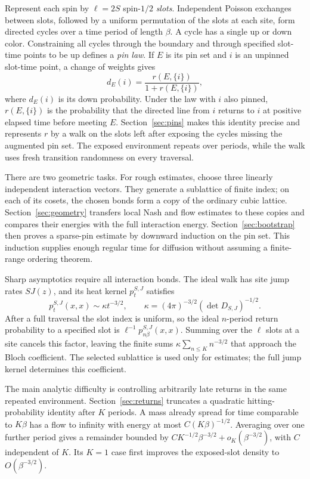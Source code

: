 Represent each spin by $\ell=2S$ spin-$1/2$ \emph{slots}. Independent
Poisson exchanges between slots, followed by a uniform permutation of
the slots at each site, form directed cycles over a time period of
length $\beta$. A cycle has a single up or down color. Constraining
all cycles through the boundary and through specified slot-time points
to be up defines a \emph{pin law}. If $E$ is its pin set and $i$ is
an unpinned slot-time point, a change of weights gives
\[
 d_E(i)=\frac{r(E,\{i\})}{1+r(E,\{i\})},
\]
where $d_E(i)$ is its down probability. Under the law with $i$ also
pinned, $r(E,\{i\})$ is the probability that the directed line from
$i$ returns to $i$ at positive elapsed time before meeting $E$.
Section~\ref{sec:pins} makes this identity precise and represents
$r$ by a walk on the slots left after exposing the cycles missing the
augmented pin set. The exposed environment repeats over periods, while
the walk uses fresh transition randomness on every traversal.

There are two geometric tasks. For rough estimates, choose three
linearly independent interaction vectors. They generate a sublattice
of finite index; on each of its cosets, the chosen bonds form a copy
of the ordinary cubic lattice. Section~\ref{sec:geometry} transfers
local Nash and flow estimates to these copies and compares their
energies with the full interaction energy. Section~\ref{sec:bootstrap}
then proves a sparse-pin estimate by downward induction on the pin
set. This induction supplies enough regular time for diffusion without
assuming a finite-range ordering theorem.

Sharp asymptotics require all interaction bonds. The ideal walk has
site jump rates $SJ(z)$, and its heat kernel $p_t^{S,J}$ satisfies
\[
 p_t^{S,J}(x,x)\sim\kappa t^{-3/2},\qquad
 \kappa=(4\pi)^{-3/2}(\det D_{S,J})^{-1/2}.
\]
After a full traversal the slot index is uniform, so the ideal
$n$-period return probability to a specified slot is
$\ell^{-1}p_{n\beta}^{S,J}(x,x)$. Summing over the $\ell$ slots at a
site cancels this factor, leaving the finite sums
$\kappa\sum_{n\le K}n^{-3/2}$ that approach the Bloch coefficient.
The selected sublattice is used only for estimates; the full jump
kernel determines this coefficient.

The main analytic difficulty is controlling arbitrarily late returns
in the same repeated environment. Section~\ref{sec:returns} truncates
a quadratic hitting-probability identity after $K$ periods. A mass
already spread for time comparable to $K\beta$ has a flow to infinity
with energy at most $C(K\beta)^{-1/2}$. Averaging over one further
period gives a remainder bounded by
$CK^{-1/2}\beta^{-3/2}+o_K(\beta^{-3/2})$, with $C$ independent of
$K$. Its $K=1$ case first improves the exposed-slot density to
$O(\beta^{-3/2})$.

